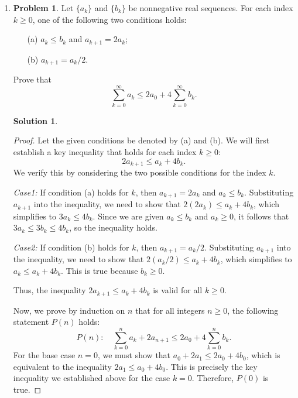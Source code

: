 \documentclass[12pt]{article}
\theoremstyle{definition}
\newtheorem*{solution}{\normalfont\textbf{Solution}}
\newtheorem*{Problem}{\noindent\textbf{Problem}}
\begin{document}
\begin{enumerate}[leftmargin=*]
    \item \begin{Problem}
            Let \( \{ a_k \} \) and \( \{ b_k \} \) be nonnegative real sequences. For each index \( k \geq 0 \), one of the following two conditions holds:
            \begin{enumerate}
                \item[(a)] \( a_k \leq b_k \) and \( a_{k + 1} = 2a_k \);
                \item[(b)] \( a_{k + 1} = a_k / 2 \).
            \end{enumerate}
            Prove that
            \[
            \sum_{k=0}^{\infty} a_k \leq 2a_0 + 4\sum_{k=0}^{\infty} b_k.
            \]
        \end{Problem}
        \begin{solution}
            \begin{proof}
                Let the given conditions be denoted by (a) and (b). We will first establish a key inequality that holds for each index \(k \geq 0\):
                \[
                2a_{k+1} \leq a_k + 4b_k.
                \]
                We verify this by considering the two possible conditions for the index \(k\).
                
                \textit{Case1:} If condition (a) holds for \(k\), then \(a_{k+1} = 2a_k\) and \(a_k \leq b_k\). Substituting \(a_{k+1}\) into the inequality, we need to show that \(2(2a_k) \leq a_k + 4b_k\), which simplifies to \(3a_k \leq 4b_k\). Since we are given \(a_k \leq b_k\) and \(a_k \geq 0\), it follows that \(3a_k \leq 3b_k \leq 4b_k\), so the inequality holds.
                
                \textit{Case2:} If condition (b) holds for \(k\), then \(a_{k+1} = a_k/2\). Substituting \(a_{k+1}\) into the inequality, we need to show that \(2(a_k/2) \leq a_k + 4b_k\), which simplifies to \(a_k \leq a_k + 4b_k\). This is true because \(b_k \geq 0\).
                
                Thus, the inequality \(2a_{k+1} \leq a_k + 4b_k\) is valid for all \(k \geq 0\).

                Now, we prove by induction on \(n\) that for all integers \(n \geq 0\), the following statement \(P(n)\) holds:
                \[
                P(n): \quad \sum_{k=0}^{n} a_k + 2a_{n+1} \leq 2a_0 + 4\sum_{k=0}^{n} b_k.
                \]
                For the base case \(n=0\), we must show that \(a_0 + 2a_1 \leq 2a_0 + 4b_0\), which is equivalent to the inequality \(2a_1 \leq a_0 + 4b_0\). This is precisely the key inequality we established above for the case \(k=0\). Therefore, \(P(0)\) is true.


\end{proof}
\end{solution}
\end{enumerate}
\end{document}
